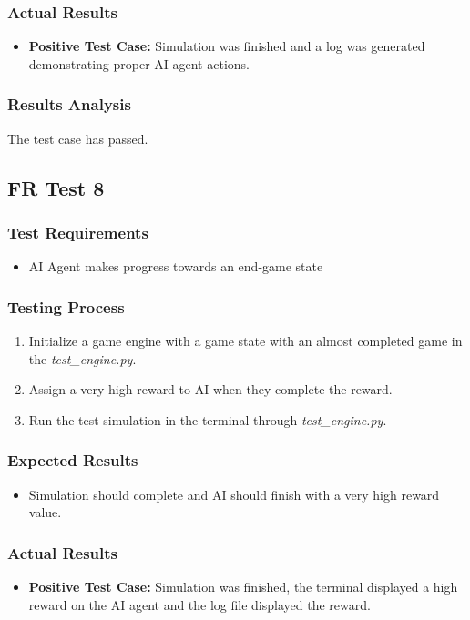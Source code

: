 \documentclass[12pt, titlepage]{article}
\begin{document}
\subsubsection{Actual Results}
\begin{itemize}
    \item \textbf{Positive Test Case:} Simulation was finished and a log was generated demonstrating proper AI agent actions.
\end{itemize}
\subsubsection{Results Analysis}
The test case has passed.

\subsection{FR Test 8}
\subsubsection{Test Requirements}
\begin{itemize}
    \item AI Agent makes progress towards an end-game state
\end{itemize}
\subsubsection{Testing Process}
\begin{enumerate}
    \item Initialize a game engine with a game state with an almost completed game in the \textit{test\_engine.py}. 
    \item Assign a very high reward to AI when they complete the reward.
    \item Run the test simulation in the terminal through \textit{test\_engine.py}.
\end{enumerate}
\subsubsection{Expected Results}
\begin{itemize}
    \item Simulation should complete and AI should finish with a very high reward value.
\end{itemize}
\subsubsection{Actual Results}
\begin{itemize}
    \item \textbf{Positive Test Case:} Simulation was finished, the terminal displayed a high reward on the AI agent and the log file displayed the reward.
\end{itemize}
\end{document}
